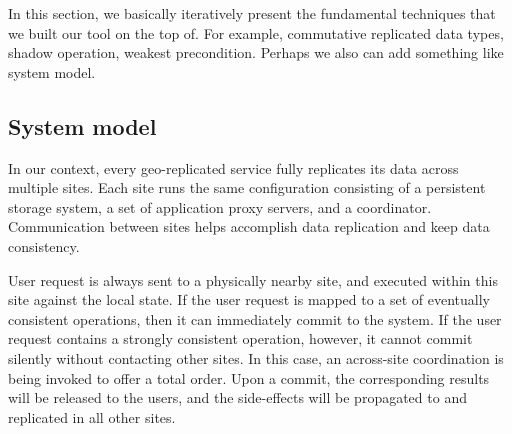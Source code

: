



In this section, we basically iteratively present the fundamental
techniques that we built our tool on the top of. For example,
commutative replicated data types, shadow operation, weakest
precondition. Perhaps we also can add something like system model.


\subsection{System model}
In our context, every geo-replicated service fully replicates its data across multiple sites. 
Each site runs the same configuration consisting of a persistent storage
system, a set of application proxy servers, and a coordinator. Communication between
sites helps accomplish data replication and keep data consistency. 

User request is always sent to a physically nearby site, and executed within this site
against the local state. If the user request is mapped to a set of eventually
consistent operations, then it can immediately commit to the system. If the user request contains a strongly consistent
operation, however, it cannot commit silently without contacting other sites. In this case,
an across-site coordination is being invoked to offer a total order. Upon a commit,
the corresponding results will be released to the users, and the side-effects will
be propagated to and replicated in all other sites.


